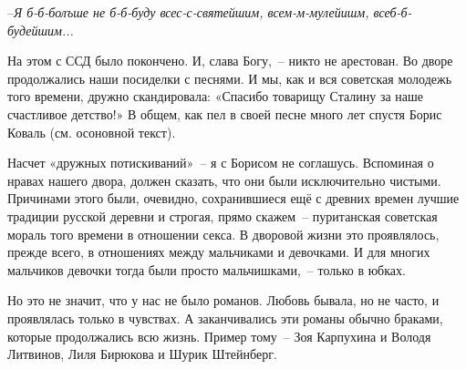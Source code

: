 --\textit{Я б-б-болъше не б-б-буду всес-с-святейшим, всем-м-мулейишм, всеб-б-будейшим...}

На этом с ССД было покончено. И, слава Богу,~-- никто не арестован. Во дворе продолжались наши посиделки с песнями. И мы, как и вся советская молодежь того времени, дружно скандировала: «Спасибо товарищу Сталину за наше счастливое детство!» В общем, как пел в своей песне много лет спустя Борис Коваль (см. осоновной текст).

Насчет «дружных потискиваний»~-- я с Борисом не соглашусь. Вспоминая о нравах нашего двора, должен сказать, что они были исключительно чистыми. Причинами этого были, очевидно, сохранившиеся ещё с древних времен лучшие традиции русской деревни и строгая, прямо скажем~-- пуританская советская мораль того времени в отношении секса. В дворовой жизни это проявлялось, прежде всего, в отношениях между мальчиками и девочками. И для многих мальчиков девочки тогда были просто мальчишками,~-- только в юбках.

Но это не значит, что у нас не было романов. Любовь бывала, но не часто, и проявлялась только в чувствах. А заканчивались эти романы обычно браками, которые продолжались всю жизнь. Пример тому~-- Зоя Карпухина и Володя Литвинов, Лиля Бирюкова и Шурик Штейнберг.

